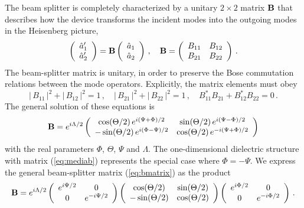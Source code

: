 \documentclass[12pt,amsmath,amssymb]{article}
\def\underline#1{{\bf #1}}
\numberwithin{equation}{section}
\begin{document}
The beam splitter is completely characterized by a unitary
$2\times2$ matrix $\underline{B}$ that describes how the device
transforms the incident modes into the outgoing modes in the
Heisenberg picture,
\begin{equation}
\label{eq:bs} \left(
    \begin{array}{c}
     \hat{a}_1'  \\
     \hat{a}_2'
    \end{array}
\right) = \underline{B} \left(
    \begin{array}{c}
     \hat{a}_1  \\
     \hat{a}_2
    \end{array}
\right)\,,\quad \underline{B} = \left(
    \begin{array}{cc}
      B_{11} & B_{12} \\
      B_{21} & B_{22}
    \end{array}
\right)\,.
\end{equation}
The beam-splitter matrix is unitary, in order to preserve the
Bose commutation relations between the mode operators.
Explicitly, the matrix elements must obey
\begin{equation}
|\,B_{11}\,|^2+|\,B_{12}\,|^2=1\,,\quad
|\,B_{21}\,|^2+|\,B_{22}\,|^2=1\,,\quad
B_{11}^*B_{21}+B_{12}^*B_{22}=0\,.
\end{equation}
The general solution of these equations is
\begin{equation}
\label{eq:bmatrix} \underline{B} = e^{i\Lambda/2}\left(
    \begin{array}{cc}
      \cos(\Theta/2)\,e^{i(\Psi+\Phi)/2} &
      \sin(\Theta/2)\,e^{i(\Psi-\Phi)/2}  \\
      -\sin(\Theta/2)\,e^{i(\Phi-\Psi)/2}  &
      \cos(\Theta/2)\,e^{-i(\Psi+\Phi)/2}
    \end{array}
\right)
\end{equation}
with the real parameters $\Phi$, $\Theta$, $\Psi$ and $\Lambda$.
The one-dimensional dielectric structure with matrix
(\ref{eq:mediab}) represents the special case where $\Phi=-\Psi$.
We express the general beam-splitter matrix (\ref{eq:bmatrix}) as
the product
\begin{equation}
\label{eq:u2} \underline{B} = e^{i\Lambda/2} \left(
    \begin{array}{cc}
      e^{i\Psi/2} & 0 \\
      0 & e^{-i\Psi/2}
    \end{array}\right) \left(
    \begin{array}{cc}
      \cos(\Theta/2) & \sin(\Theta/2) \\
      -\sin(\Theta/2) & \cos(\Theta/2)
    \end{array}
\right)\left(
    \begin{array}{cc}
      e^{i\Phi/2} & 0 \\
      0 & e^{-i\Phi/2}
    \end{array}\right)\,.
\end{equation}
\end{document}
